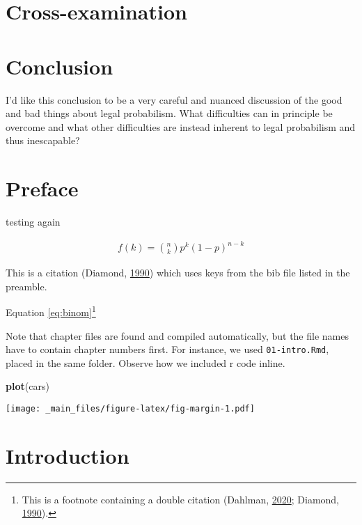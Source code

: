 \documentclass[]{book}
\newenvironment{Shaded}{\begin{snugshade}}{\end{snugshade}}
\newcommand{\KeywordTok}[1]{\textcolor[rgb]{0.13,0.29,0.53}{\textbf{#1}}}
\newcommand{\NormalTok}[1]{#1}
\begin{document}
\chapter{Cross-examination}

\chapter{Conclusion}

I'd like this conclusion to be a very careful and nuanced discussion of
the good and bad things about legal probabilism. What difficulties can
in principle be overcome and what other difficulties are instead
inherent to legal probabilism and thus inescapable?

\chapter*{Preface}\label{preface}

testing again

\begin{align} 
  f\left(k\right) = \binom{n}{k} p^k\left(1-p\right)^{n-k}
  \label{eq:binom}
\end{align}

This is a citation (Diamond, \protect\hyperlink{ref-diamond90}{1990})
which uses keys from the bib file listed in the preamble.

Equation \eqref{eq:binom}\footnote{This is a footnote containing a double
  citation (Dahlman, \protect\hyperlink{ref-dahlmanNakedStat2020}{2020};
  Diamond, \protect\hyperlink{ref-diamond90}{1990}).}

Note that chapter files are found and compiled automatically, but the
file names have to contain chapter numbers first. For instance, we used
\texttt{01-intro.Rmd}, placed in the same folder. Observe how we
included r code inline.

\begin{Shaded}
\begin{Highlighting}[]
\KeywordTok{plot}\NormalTok{(cars)}
\end{Highlighting}
\end{Shaded}

\texttt{[image: \_main\_files/figure-latex/fig-margin-1.pdf]}

\chapter{Introduction}\label{ch:intro}
\end{document}
